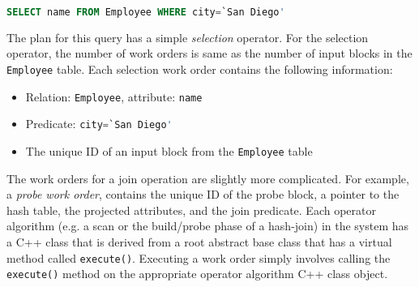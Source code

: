 \begin{lstlisting}[language=SQL, 
basicstyle=\ttfamily\small, 
showstringspaces=false,
keywordstyle=\color{cardinal}\bfseries, 
emph={San,Diego}, 
emphstyle=\color{bondiblue}\bfseries]
SELECT name FROM Employee WHERE city=`San Diego'
\end{lstlisting}	
\vspace{-0.4em}

The plan for this query has a simple \textit{selection} operator.  
For the selection operator, the number of work orders is same as the number of input blocks in the \verb+Employee+ table. 
Each selection work order contains the following information:
\begin{itemize}
	\itemsep0.1em
	\item {Relation: \verb+Employee+, attribute: \verb|name|}
	\item {Predicate: \lstinline[language=SQL, 
		basicstyle=\ttfamily\small, 
		keywordstyle=\color{cardinal} \bfseries,
		emph={San,Diego}, 
		emphstyle=\color{bondiblue}\bfseries]|city=`San Diego'|}
	\item {The unique ID of an input block from the \verb+Employee+ table}
\end{itemize}

The work orders for a join operation %
are slightly more complicated. 
For example, a \textit{probe work order},  contains the unique ID of the probe 
block, %
a pointer to the hash table, the projected attributes, and the join predicate.
Each operator algorithm (e.g. a scan or the build/probe phase of a hash-join) 
in the system has a C++ class that is derived from a root abstract base class that has a virtual method called \verb|execute()|.
Executing a work order simply involves calling the \verb|execute()| method 
on the appropriate operator algorithm C++ class object. 
